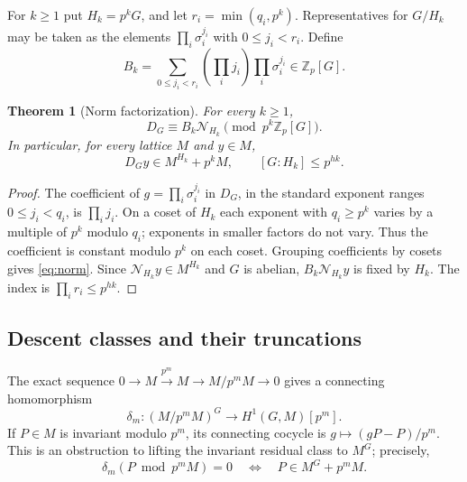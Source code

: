 \documentclass[11pt,a4paper]{article}
\newtheorem{theorem}{Theorem}[section]
\theoremstyle{definition}
\theoremstyle{remark}
\newcommand{\Zp}{\mathbb Z_p}
\newcommand{\N}{\mathcal N}
\begin{document}
For $k\ge1$ put $H_k=p^kG$, and let $r_i=\min(q_i,p^k)$. Representatives for $G/H_k$ may be taken as the elements $\prod_i\sigma_i^{j_i}$ with $0\le j_i<r_i$. Define
\begin{equation}\label{eq:bk}
 B_k=\sum_{0\le j_i<r_i}\left(\prod_i j_i\right)\prod_i\sigma_i^{j_i}\in\Zp[G].
\end{equation}

\begin{theorem}[Norm factorization]\label{thm:norm}
For every $k\ge1$,
\begin{equation}\label{eq:norm}
 D_G\equiv B_k\N_{H_k}\pmod{p^k\Zp[G]}.
\end{equation}
In particular, for every lattice $M$ and $y\in M$,
\begin{equation}\label{eq:fixed}
 D_Gy\in M^{H_k}+p^kM,\qquad [G:H_k]\le p^{hk}.
\end{equation}
\end{theorem}
\begin{proof}
The coefficient of $g=\prod_i\sigma_i^{j_i}$ in $D_G$, in the standard exponent ranges $0\le j_i<q_i$, is $\prod_i j_i$. On a coset of $H_k$ each exponent with $q_i\ge p^k$ varies by a multiple of $p^k$ modulo $q_i$; exponents in smaller factors do not vary. Thus the coefficient is constant modulo $p^k$ on each coset. Grouping coefficients by cosets gives \eqref{eq:norm}. Since $\N_{H_k}y\in M^{H_k}$ and $G$ is abelian, $B_k\N_{H_k}y$ is fixed by $H_k$. The index is $\prod_i r_i\le p^{hk}$.
\end{proof}

\subsection{Descent classes and their truncations}
The exact sequence $0\to M\xrightarrow{p^m}M\to M/p^mM\to0$ gives a connecting homomorphism
\[
 \delta_m:(M/p^mM)^G\longrightarrow H^1(G,M)[p^m].
\]
If $P\in M$ is invariant modulo $p^m$, its connecting cocycle is $g\mapsto(gP-P)/p^m$. This is an obstruction to lifting the invariant residual class to $M^G$; precisely,
\begin{equation}\label{eq:kernel}
 \delta_m(P\bmod p^mM)=0\quad\Longleftrightarrow\quad P\in M^G+p^mM.
\end{equation}
\end{document}
